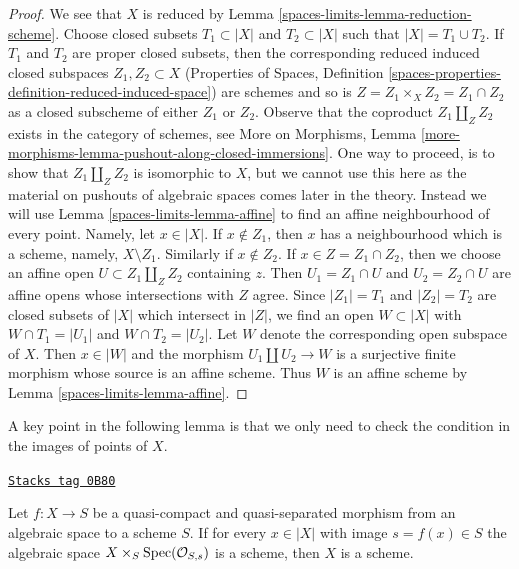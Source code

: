 \begin{proof}
We see that $X$ is reduced by Lemma \ref{spaces-limits-lemma-reduction-scheme}.
Choose closed subsets $T_1 \subset |X|$ and $T_2 \subset |X|$ such that
$|X| = T_1 \cup T_2$. If $T_1$ and $T_2$ are proper closed subsets,
then the corresponding reduced induced closed subspaces $Z_1, Z_2 \subset X$
(Properties of Spaces, Definition
\ref{spaces-properties-definition-reduced-induced-space})
are schemes and so is $Z = Z_1 \times_X Z_2 = Z_1 \cap Z_2$ as a closed
subscheme of either $Z_1$ or $Z_2$. Observe that the coproduct
$Z_1 \amalg_Z Z_2$ exists in the category of schemes, see
More on Morphisms, Lemma
\ref{more-morphisms-lemma-pushout-along-closed-immersions}.
One way to proceed, is to show that $Z_1 \amalg_Z Z_2$ is isomorphic to $X$,
but we cannot use this here as the material on pushouts of algebraic
spaces comes later in the theory. Instead we will use
Lemma \ref{spaces-limits-lemma-affine} to find an affine neighbourhood of every point.
Namely, let $x \in |X|$. If $x \not \in Z_1$, then $x$ has a neighbourhood
which is a scheme, namely, $X \setminus Z_1$. Similarly if $x \not \in Z_2$.
If $x \in Z = Z_1 \cap Z_2$, then we choose an affine open
$U \subset Z_1 \amalg_Z Z_2$ containing $z$. Then $U_1 = Z_1 \cap U$
and $U_2 = Z_2 \cap U$ are affine opens whose intersections with
$Z$ agree. Since $|Z_1| = T_1$ and $|Z_2| = T_2$ are closed subsets of
$|X|$ which intersect in $|Z|$, we find an open $W \subset |X|$
with $W \cap T_1 = |U_1|$ and $W \cap T_2 = |U_2|$. Let $W$ denote the
corresponding open subspace of $X$. Then $x \in |W|$ and the morphism
$U_1 \amalg U_2 \to W$ is a surjective finite morphism whose source
is an affine scheme. Thus $W$ is an affine scheme by
Lemma \ref{spaces-limits-lemma-affine}.
\end{proof}

A key point in the following lemma is that we only need to check
the condition in the images of points of $X$.

\begin{lemma}
\label{spaces-limits-lemma-enough-local}
\href{https://stacks.math.columbia.edu/tag/0B80}{\texttt{Stacks tag 0B80}}

Let $f: X \to S$ be a quasi-compact and quasi-separated morphism from an
algebraic space to a scheme $S$. If for every $x \in |X|$ with image
$s = f(x) \in S$ the algebraic space $X \times_S \operatorname{Spec}(\mathcal{O}_{S,s})$
is a scheme, then $X$ is a scheme.
\end{lemma}

